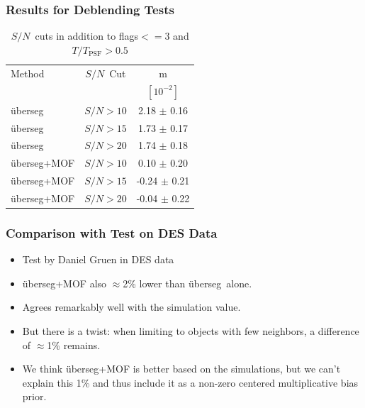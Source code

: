 \documentclass{beamer}
\newcommand{\snr}{$S/N$}
\newcommand{\uberseg}{{\"u}berseg}
\begin{document}
\frame
{

    \frametitle{Results for Deblending Tests}

    \begin{table}
        \centering
        \begin{tabular}{ l c c}
            \hline
            Method         & \snr\ Cut & m            \\
                       &           & $[10^{-2}]$  \\
            \hline
            \hline

            \uberseg       & \snr$ > 10$ & 2.18 $\pm$ 0.16  \\
            \uberseg       & \snr$ > 15$ & 1.73 $\pm$ 0.17  \\
            \uberseg       & \snr$ > 20$ & 1.74 $\pm$ 0.18  \\


            \hline

            \uberseg+MOF   & \snr$ > 10$ & 0.10 $\pm$ 0.20  \\
            \uberseg+MOF   & \snr$ > 15$ & -0.24 $\pm$ 0.21 \\
            \uberseg+MOF   & \snr$ > 20$ & -0.04 $\pm$ 0.22 \\



            \hline
        \end{tabular}

        \caption{\snr\ cuts in addition to flags$<= 3$ and
        $T/T_{\mathrm{PSF}} > 0.5$}
    \end{table}


}

\frame
{

    \frametitle{Comparison with Test on DES Data}


    \begin{itemize}

        \item Test by Daniel Gruen in DES data

        \item \uberseg+MOF also $\approx$2\% lower than \uberseg\ alone.

        \item Agrees remarkably well with the simulation value.

        \item But there is a twist: when limiting to objects
            with few neighbors, a difference of $\approx$1\% remains.

        \item We think \uberseg+MOF is better based on the simulations,
            but we can't explain this 1\% and thus include it as a non-zero
            centered multiplicative bias prior. 

    \end{itemize}


}
\end{document}
